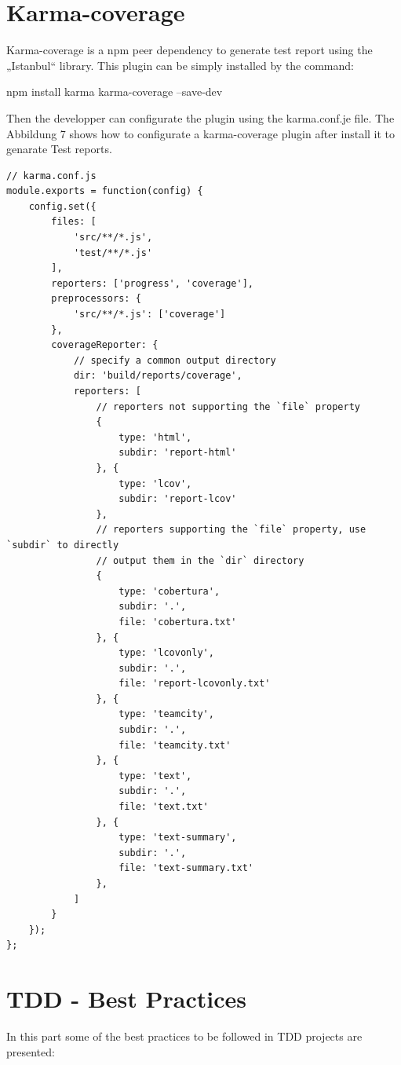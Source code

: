 \documentclass[11pt]{article}
\begin{document}
\section{Karma-coverage}

Karma-coverage is a npm peer dependency to generate test report using the „Istanbul“ library. This plugin can be simply installed by the command:

\textdollar{} npm install karma karma-coverage --save-dev

Then the developper can configurate the plugin using the karma.conf.je file. The Abbildung 7 shows how to configurate a karma-coverage plugin after install it to genarate Test reports.

\begin{lstlisting}[caption=Karma-coverage configuration's file]
// karma.conf.js  
module.exports = function(config) {
    config.set({
        files: [
            'src/**/*.js',
            'test/**/*.js'
        ],
        reporters: ['progress', 'coverage'],
        preprocessors: {
            'src/**/*.js': ['coverage']
        },
        coverageReporter: {
            // specify a common output directory  
            dir: 'build/reports/coverage',
            reporters: [
                // reporters not supporting the `file` property  
                {
                    type: 'html',
                    subdir: 'report-html'
                }, {
                    type: 'lcov',
                    subdir: 'report-lcov'
                },
                // reporters supporting the `file` property, use `subdir` to directly  
                // output them in the `dir` directory  
                {
                    type: 'cobertura',
                    subdir: '.',
                    file: 'cobertura.txt'
                }, {
                    type: 'lcovonly',
                    subdir: '.',
                    file: 'report-lcovonly.txt'
                }, {
                    type: 'teamcity',
                    subdir: '.',
                    file: 'teamcity.txt'
                }, {
                    type: 'text',
                    subdir: '.',
                    file: 'text.txt'
                }, {
                    type: 'text-summary',
                    subdir: '.',
                    file: 'text-summary.txt'
                },
            ]
        }
    });
};
\end{lstlisting}

\section{TDD - Best Practices}
In this part some of the best practices to be followed in TDD projects are presented:
\end{document}

